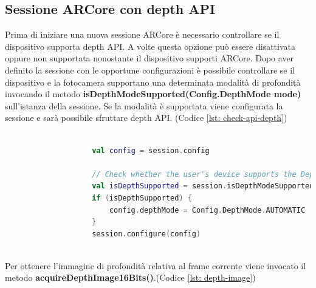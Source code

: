 \documentclass[crop=false, class=book]{standalone}
\begin{document}
		\clearpage
		
		\subsection{Sessione ARCore con depth API}
		
			Prima di iniziare una nuova sessione ARCore è necessario controllare se il dispositivo supporta depth API. A volte 				questa opzione può essere disattivata oppure non supportata nonostante il dispositivo supporti ARCore. Dopo aver 				definito la sessione con le opportune configurazioni è possibile controllare se il dispositivo e la fotocamera 					supportano una determinata modalità di profondità invocando il metodo \textbf{isDepthModeSupported(Config.DepthMode 			mode)} sull'istanza della sessione. Se la modalità è supportata viene configurata la sessione e sarà possibile 					sfruttare depth API. (Codice \vref{lst: check-api-depth})\\
		
			\begin{center}
				\begin{minipage}{0.95\textwidth}
					\begin{lstlisting}[caption={ Controllo supporto depth API}, label={lst: check-api-depth}, language=Kotlin]
				
					val config = session.config

					// Check whether the user's device supports the Depth API.
					val isDepthSupported = session.isDepthModeSupported(Config.DepthMode.AUTOMATIC)
					if (isDepthSupported) {
  						config.depthMode = Config.DepthMode.AUTOMATIC
					}
					session.configure(config)
				
					\end{lstlisting}
			\end{minipage}
		\end{center}
		
		\begin{flushleft}
		Per ottenere l'immagine di profondità relativa al frame corrente viene invocato il metodo 										\textbf{acquireDepthImage16Bits()}.(Codice \vref{lst: depth-image})\\
		\end{flushleft}
		
\end{document}
